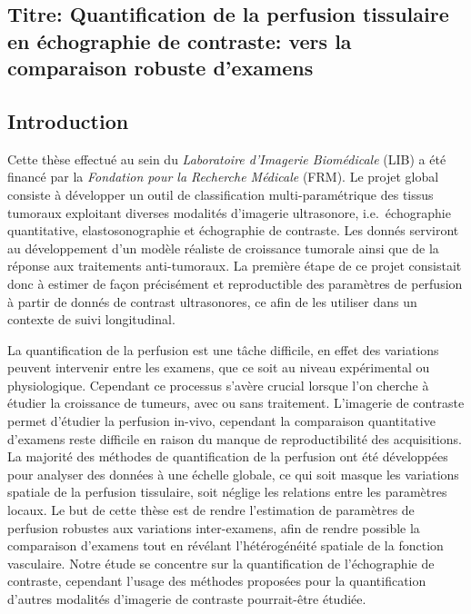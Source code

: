 \begin{otherlanguage}{francais}
\subsection*{Titre: Quantification de la perfusion tissulaire en \'echographie de contraste: vers la comparaison robuste d'examens}

\subsection*{Introduction}
Cette th\`ese effectu\'e au sein du {\em Laboratoire d'Imagerie Biom\'edicale} (LIB) a \'et\'e financ\'e par la {\em Fondation pour la Recherche M\'edicale} (FRM).
Le projet global consiste \`a d\'evelopper un outil de classification multi-param\'etrique des tissus tumoraux exploitant diverses modalit\'es d'imagerie ultrasonore, i.e.~\'echographie quantitative, elastosonographie et \'echographie de contraste.
Les donn\'es serviront au d\'eveloppement d'un mod\`ele r\'ealiste de croissance tumorale ainsi que de la r\'eponse aux traitements anti-tumoraux.
La premi\`ere \'etape de ce projet consistait donc \`a estimer de fa\c{c}on pr\'ecis\'ement et reproductible des param\`etres de perfusion \`a partir de donn\'es de contrast ultrasonores, ce afin de les utiliser dans un contexte de suivi longitudinal.

La quantification de la perfusion est une t\^ache difficile, en effet des variations peuvent intervenir entre les examens, que ce soit au niveau exp\'erimental ou physiologique. 
Cependant ce processus s'av\`ere crucial lorsque l'on cherche \`a \'etudier la croissance de tumeurs, avec ou sans traitement.
L'imagerie de contraste permet d'\'etudier la perfusion in-vivo, cependant la comparaison quantitative d'examens reste difficile en raison du manque de reproductibilit\'e des acquisitions.
La majorit\'e des m\'ethodes de quantification de la perfusion ont \'et\'e d\'evelopp\'ees pour analyser des donn\'ees \`a une \'echelle globale, ce qui soit masque les variations spatiale de la perfusion tissulaire, soit n\'eglige les relations entre les param\`etres locaux.
Le but de cette th\`ese est de rendre l'estimation de param\`etres de perfusion robustes aux variations inter-examens, afin de rendre possible la comparaison d'examens tout en r\'ev\'elant l'h\'et\'erog\'en\'eit\'e spatiale de la fonction vasculaire.
Notre \'etude se concentre sur la quantification de l'\'echographie de contraste, cependant l'usage des m\'ethodes propos\'ees pour la quantification d'autres modalit\'es d'imagerie de contraste pourrait-\^etre \'etudi\'ee.


\end{otherlanguage}

